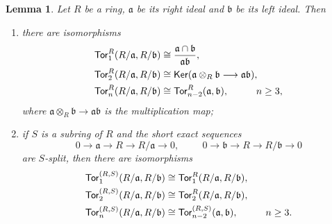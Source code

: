 \documentclass{amsart}
\numberwithin{equation}{section}
\newtheorem{lemma}[theorem]{Lemma}
\theoremstyle{definition}
\def\aa{\mathfrak{a}}
\def\bb{\mathfrak{b}}
\begin{document}
\begin{lemma}\label{lemma:tor(r/a,r/b)} Let $R$ be a ring,  $\mathfrak{a}$ be its right ideal  and $\mathfrak{b}$ be its left ideal. Then 
\begin{enumerate}
\item there are isomorphisms 
\begin{subequations}
\begin{align}
{\sf Tor}_1^R(R/\aa, R/\bb) &\cong \frac{\aa \cap \bb }{\aa\bb}, \\
{\sf Tor}_2^R(R/\mathfrak{a}, R/\mathfrak{b}) &\cong {\sf Ker}(\mathfrak{a}\otimes_R\mathfrak{b}\longrightarrow \mathfrak{a}\mathfrak{b}),\\
{\sf Tor}^R_n(R/\aa,R/\bb) &\cong {\sf Tor}^R_{n-2}(\aa,\bb), \hspace{1cm} n\geq 3,
\end{align}
\end{subequations}
where $\mathfrak{a}\otimes_R\mathfrak{b}\to \mathfrak{a}\mathfrak{b}$ is the multiplication map;
\item if $S$ is a subring of $R$ and the short exact sequences $$ 0\to \mathfrak{a} \to R \to R/\mathfrak{a}\to 0, \hspace{1cm} 0 \to \mathfrak{b} \to R \to R/\mathfrak{b}\to 0$$
are $S$-split, then there are  isomorphisms 
\begin{subequations}
\begin{align}
{\sf Tor}_1^{(R,S)}(R/\aa, R/\bb) &\cong {\sf Tor}_1^{R}(R/\aa, R/\bb),  \\
{\sf Tor}_2^{(R,S)}(R/\mathfrak{a}, R/\mathfrak{b}) &\cong {\sf Tor}_2^R(R/\mathfrak{a}, R/\mathfrak{b}), \label{eq:tor_2}\\ 
{\sf Tor}^{(R,S)}_n(R/\aa,R/\bb) &\cong {\sf Tor}^{(R,S)}_{n-2}(\aa,\bb), \hspace{1cm} n\geq 3.
\end{align}
\end{subequations}


\end{enumerate}
\end{lemma}
\end{document}
